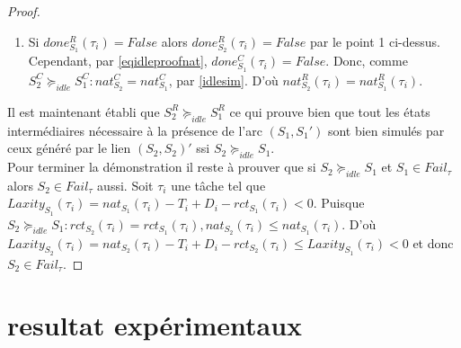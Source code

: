 \documentclass[a4paper]{report}
\theoremstyle{break}
\theoremstyle{breakplain}
\begin{document}
\begin{proof}
\begin{enumerate}[label=(\alph*)]
\item Si $done_{S_1}^R(\tau_i) = False$ alors $done_{S_2}^R(\tau_i) = False$ par le point 1 ci-dessus. Cependant, par \eqref{eqidleproofnat}, $done_{S_1}^C(\tau_i) = False$. Donc, comme $S^C_2 \succeq_{idle} S^C_1 : nat_{S_2}^C = nat_{S_1}^C$, par \autoref{idlesim}. D'où $nat_{S_2}^R(\tau_i) = nat_{S_1}^R(\tau_i)$.
\end{enumerate}
Il est maintenant établi que $S^R_2 \succeq_{idle} S^R_1$ ce qui prouve bien que tout les états intermédiaires nécessaire à la présence de l'arc $(S_1, S_1')$ sont bien simulés par ceux généré par le lien $(S_2, S_2)'$ ssi $S_2 \succeq_{idle} S_1$.\\

Pour terminer la démonstration il reste à prouver que si $S_2 \succeq_{idle} S_1$ et $S_1 \in Fail_\tau$ alors $S_2 \in Fail_\tau$ aussi. Soit $\tau_i$ une tâche tel que $Laxity_{S_1}(\tau_i) = nat_{S_1}(\tau_i) -T_i + D_i - rct_{S_1}(\tau_i) < 0$. Puisque $S_2 \succeq_{idle} S_1 : rct_{S_2}(\tau_i) = rct_{S_1}(\tau_i), nat_{S_2}(\tau_i) \leq nat_{S_1}(\tau_i)$. D'où $Laxity_{S_2}(\tau_i) = nat_{S_2}(\tau_i) -T_i + D_i - rct_{S_2}(\tau_i) \leq Laxity_{S_1}(\tau_i) < 0$ et donc $S_2 \in Fail_\tau$.

\end{proof}

\chapter{resultat expérimentaux}
\end{document}
